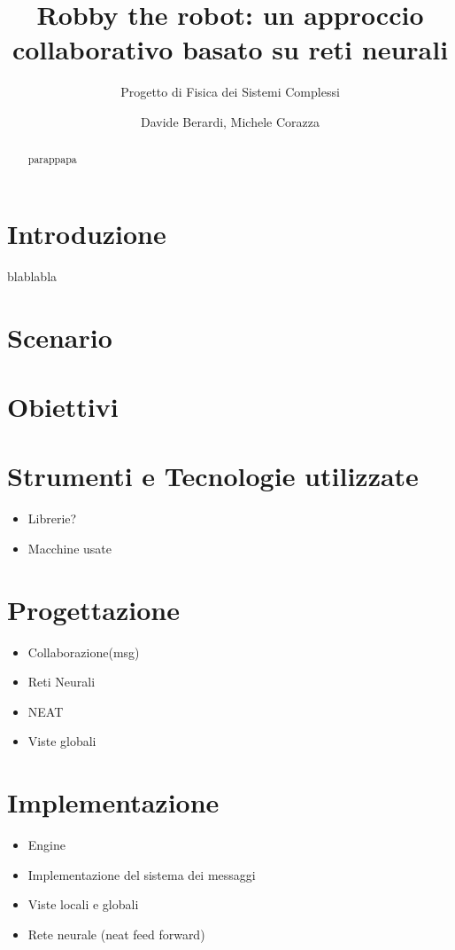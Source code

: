 \documentclass[a4paper,10pt,abstracton]{scrartcl}
\begin{document}
\title{Robby the robot: un approccio collaborativo basato su reti neurali}
\subtitle{Progetto di Fisica dei Sistemi Complessi}

\author{Davide Berardi, Michele Corazza}



\maketitle

\begin{abstract}
parappapa
\end{abstract}

\section{Introduzione}
blablabla

\section{Scenario}




\section {Obiettivi}



\section{Strumenti e Tecnologie utilizzate}
\begin{itemize}
 \item Librerie?
 \item Macchine usate
\end{itemize}


\section{Progettazione}
\begin{itemize}
 \item Collaborazione(msg)
 \item Reti Neurali
 \item NEAT
 \item Viste globali
\end{itemize}


\section{Implementazione}
\begin{itemize}
 \item Engine
 \item Implementazione del sistema dei messaggi
 \item Viste locali e globali
 \item Rete neurale (neat feed forward)
\end{itemize}
\end{document}
